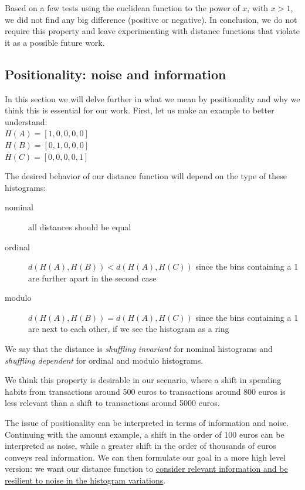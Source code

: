 Based on a few tests using the euclidean function to the power of $x$, with $x > 1$, we did not find any big difference (positive or negative). In conclusion, we do not require this property and leave experimenting with distance functions that violate it as a possible future work.

\subsection{Positionality: noise and information}

In this section we will delve further in what we mean by positionality and why we think this is essential for our work.
First, let us make an example to better understand:\\
$H(A) = [1, 0, 0, 0, 0]$\\
$H(B) = [0, 1, 0, 0, 0]$\\
$H(C) = [0, 0, 0, 0, 1]$

The desired behavior of our distance function will depend on the type of these histograms:
\begin{description}
  \item[nominal] all distances should be equal
  \item[ordinal] $d(H(A), H(B)) < d(H(A), H(C))$ since the bins containing a 1 are further apart in the second case
  \item[modulo] $d(H(A), H(B)) = d(H(A), H(C))$ since the bins containing a 1 are next to each other, if we see the histogram as a ring
\end{description}

We say that the distance is \textit{shuffling invariant} for nominal histograms and \textit{shuffling dependent} for ordinal and modulo histograms.

We think this property is desirable in our scenario, where a shift in spending habits from transactions around 500 euros to transactions around 800 euros is less relevant than a shift to transactions around 5000 euros.

The issue of positionality can be interpreted in terms of information and noise. Continuing with the amount example, a shift in the order of 100 euros can be interpreted as noise, while a greater shift in the order of thousands of euros conveys real information. We can then formulate our goal in a more high level version: we want our distance function to \underline{consider relevant information and be resilient to noise in the histogram variations}.

